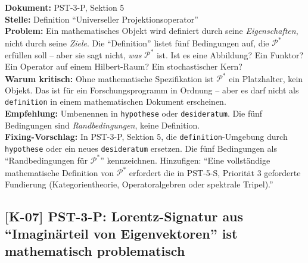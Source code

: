 \documentclass[11pt,a4paper]{article}
\newcommand{\K}[1]{\textbf{[K-#1]}}
\newcommand{\Dok}[1]{\textbf{Dokument:} #1\\}
\newcommand{\Stelle}[1]{\textbf{Stelle:} #1\\}
\newcommand{\Prob}[1]{\textbf{Problem:} #1\\}
\newcommand{\Krit}[1]{\textbf{Warum kritisch:} #1\\}
\newcommand{\Empf}[1]{\textbf{Empfehlung:} #1\\}
\newcommand{\Fix}[1]{\textbf{Fixing-Vorschlag:} #1\\}
\begin{document}
\Dok{PST-3-P, Sektion 5}
\Stelle{Definition ``Universeller Projektionsoperator''}
\Prob{Ein mathematisches Objekt wird definiert durch seine
\emph{Eigenschaften}, nicht durch seine \emph{Ziele}. Die
``Definition'' listet f\"{u}nf Bedingungen auf, die $\mathcal{P}^*$
erf\"{u}llen soll -- aber sie sagt nicht, \emph{was} $\mathcal{P}^*$
ist. Ist es eine Abbildung? Ein Funktor? Ein Operator auf einem
Hilbert-Raum? Ein stochastischer Kern?}
\Krit{Ohne mathematische Spezifikation ist $\mathcal{P}^*$ ein
Platzhalter, kein Objekt. Das ist f\"{u}r ein Forschungsprogramm in
Ordnung -- aber es darf nicht als \texttt{definition} in einem
mathematischen Dokument erscheinen.}
\Empf{Umbenennen in \texttt{hypothese} oder \texttt{desideratum}. Die
f\"{u}nf Bedingungen sind \emph{Randbedingungen}, keine Definition.}
\Fix{In PST-3-P, Sektion 5, die \texttt{definition}-Umgebung durch
\texttt{hypothese} oder ein neues \texttt{desideratum} ersetzen. Die
f\"{u}nf Bedingungen als ``Randbedingungen f\"{u}r $\mathcal{P}^*$''
kennzeichnen. Hinzufigen: ``Eine vollst\"{a}ndige mathematische
Definition von $\mathcal{P}^*$ erfordert die in PST-5-S, Priorit\"{a}t 3
geforderte Fundierung (Kategorientheorie, Operatoralgebren oder
spektrale Tripel).''}

\subsection{\K{07} PST-3-P: Lorentz-Signatur aus ``Imagin\"{a}rteil von Eigenvektoren'' ist mathematisch problematisch}
\end{document}
